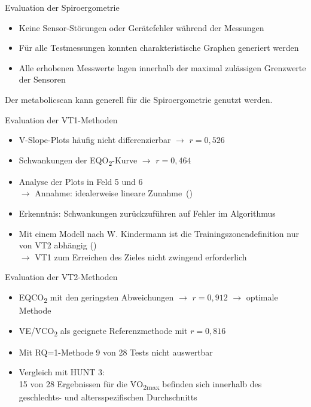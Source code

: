 \documentclass[colorBG,slideColor,8pt]{beamer}
\newcommand{\eqotwo}{EQO\textsubscript{2}}
\newcommand{\eqcotwo}{EQCO\textsubscript{2}}
\newcommand{\votwo}{\.{V}O\textsubscript{2}}
\newcommand{\vcotwo}{\.{V}CO\textsubscript{2}}
\newcommand{\ve}{\.{V}E}
\begin{document}
\begin{frame}{Evaluation der Spiroergometrie}
\begin{itemize}
	\item Keine Sensor-Störungen oder Gerätefehler während der Messungen
	\item Für alle Testmessungen konnten charakteristische Graphen generiert werden
	\item Alle erhobenen Messwerte lagen innerhalb der maximal zulässigen Grenzwerte der Sensoren
\end{itemize}
\vspace{4ex}
\begin{center}
	Der metabolicscan kann generell für die Spiroergometrie genutzt werden.
\end{center}
\end{frame}

\begin{frame}{Evaluation der VT1-Methoden}
\begin{itemize}
	\item V-Slope-Plots häufig nicht differenzierbar $\rightarrow$ $r = 0,526$
	\item Schwankungen der \eqotwo-Kurve $\rightarrow$ $r = 0,464$
	\item Analyse der Plots in Feld 5 und 6\\$\rightarrow$ Annahme: idealerweise lineare Zunahme~(\cite{Ruehle.2012})
	\item Erkenntnis: Schwankungen zurückzuführen auf Fehler im Algorithmus
	\item Mit einem Modell nach W. Kindermann ist die Trainingszonendefinition nur von VT2 abhängig (\cite{Kindermann.2004})\\$\rightarrow$ VT1 zum Erreichen des Zieles nicht zwingend erforderlich
\end{itemize}
\end{frame}

\begin{frame}{Evaluation der VT2-Methoden}
\begin{itemize}
	\item \eqcotwo{} mit den geringsten Abweichungen $\rightarrow$ $r = 0,912$ $\rightarrow$ optimale Methode
	\item \ve/\vcotwo{} als geeignete Referenzmethode mit $r = 0,816$
	\item Mit RQ=1-Methode 9 von 28 Tests nicht auswertbar
	\item Vergleich mit HUNT 3:\\15 von 28 Ergebnissen für die \votwo\textsubscript{max} befinden sich innerhalb des geschlechts- und altersspezifischen Durchschnitts
\end{itemize}
\end{frame}
\end{document}
